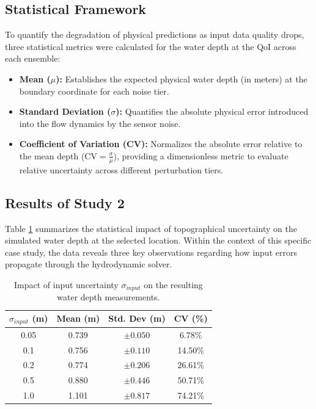 \subsection{Statistical Framework}
To quantify the degradation of physical predictions as input data quality drops, three statistical metrics were calculated for the water depth at the QoI across each ensemble:
\begin{itemize}
    \item \textbf{Mean ($\mu$):} Establishes the expected physical water depth (in meters) at the boundary coordinate for each noise tier.
    \item \textbf{Standard Deviation ($\sigma$):} Quantifies the absolute physical error introduced into the flow dynamics by the sensor noise.
    \item \textbf{Coefficient of Variation (CV):} Normalizes the absolute error relative to the mean depth ($\text{CV} = \frac{\sigma}{\mu}$), providing a dimensionless metric to evaluate relative uncertainty across different perturbation tiers.
\end{itemize}


\subsection{Results of Study 2}

Table \ref{tab:study2-results} summarizes the statistical impact of topographical uncertainty on the simulated water depth at the selected location. Within the context of this specific case study, the data reveals three key observations regarding how input errors propagate through the hydrodynamic solver.

\begin{table}[H]
  \centering
  \begin{tabular}{cccc}
    \toprule
    \textbf{$\sigma_{input}$ (m)} & \textbf{Mean (m)} & \textbf{Std. Dev (m)} & \textbf{CV (\%)} \\
    \midrule
    0.05 & 0.739 & $\pm 0.050$ & 6.78\% \\
    0.1  & 0.756 & $\pm 0.110$ & 14.50\% \\
    0.2  & 0.774 & $\pm 0.206$ & 26.61\% \\
    0.5  & 0.880 & $\pm 0.446$ & 50.71\% \\
    1.0  & 1.101 & $\pm 0.817$ & 74.21\% \\
    \bottomrule
  \end{tabular}
  \caption{Impact of input uncertainty $\sigma_{input}$ on the resulting water depth measurements.}
  \label{tab:study2-results}
\end{table}

